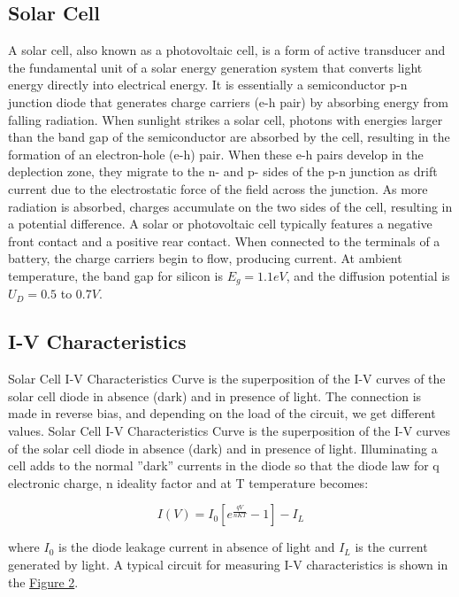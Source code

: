 	\subsection{Solar Cell}

		A solar cell, also known as a photovoltaic cell, is a form of active transducer and the fundamental unit of a solar energy generation system that converts light energy directly into electrical energy. It is essentially a semiconductor p-n junction diode that generates charge carriers (e-h pair) by absorbing energy from falling radiation. When sunlight strikes a solar cell, photons with energies larger than the band gap of the semiconductor are absorbed by the cell, resulting in the formation of an electron-hole (e-h) pair. When these e-h pairs develop in the deplection zone, they migrate to the n- and p- sides of the p-n junction as drift current due to the electrostatic force of the field across the junction. As more radiation is absorbed, charges accumulate on the two sides of the cell, resulting in a potential difference. A solar or photovoltaic cell typically features a negative front contact and a positive rear contact. When connected to the terminals of a battery, the charge carriers begin to flow, producing current. At ambient temperature, the band gap for silicon is $E_g = 1.1eV$, and the diffusion potential is $U_D = 0.5$ to $0.7V$.

	\subsection{I-V Characteristics}

		Solar Cell I-V Characteristics Curve is the superposition of the I-V curves of the solar cell diode in absence (dark) and in presence of light. The connection is made in reverse bias, and depending on the load of the circuit, we get different values. Solar Cell I-V Characteristics Curve is the superposition of the I-V curves of the solar cell diode in absence (dark) and in presence of light. Illuminating a cell adds to the normal ”dark” currents in the diode so that the diode law for q electronic charge, n ideality factor and at T temperature becomes:

		\begin{equation}
			\label{eq:1}
			I(V) = I_0\left[e^{\frac{qV}{nKT}}-1\right] - I_L
		\end{equation}
		
		where $I_0$ is the diode leakage current in absence of light and $I_L$ is the current generated by light. A typical circuit for measuring I-V characteristics is shown in the \hyperref[fig:2]{Figure 2}.

